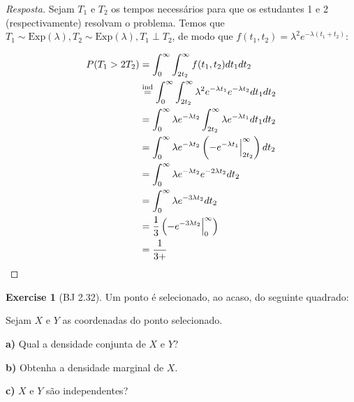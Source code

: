 \documentclass[
]{article}
\theoremstyle{definition}
\theoremstyle{definition}
\theoremstyle{definition}
\newtheorem{exercise}{Exercise}[section]
\theoremstyle{definition}
\theoremstyle{remark}
\begin{document}
\begin{proof}[Resposta]
Sejam \(T_{1}\) e \(T_{2}\) os tempos necessários para que os estudantes 1 e 2 (respectivamente) resolvam o problema. Temos que \(T_{1} \sim \mathrm{Exp}(\lambda),T_{2} \sim \mathrm{Exp}(\lambda), T_{1} \perp T_{2}\), de modo que \(f(t_{1},t_{2}) = \lambda^{2}e^{-\lambda(t_{1} + t_{2})}\):

\begin{align*}
P(T_{1} > 2T_{2}) &= \int_{0}^{\infty}\int_{2t_{2}}^{\infty}f(t_{1},t_{2})dt_{1}dt_{2} \\
&\stackrel{\text{ind}}{=} \int_{0}^{\infty}\int_{2t_{2}}^{\infty}\lambda^{2}e^{-\lambda t_{1}}e^{-\lambda t_{2}}dt_{1}dt_{2} \\
&= \int_{0}^{\infty}\lambda e^{-\lambda t_{2}}\int_{2t_{2}}^{\infty}\lambda e^{-\lambda t_{1}}dt_{1}dt_{2} \\
&= \int_{0}^{\infty}\lambda e^{-\lambda t_{2}}\left(-e^{-\lambda t_{1}}\Big{|}_{2t_{2}}^{\infty}\right)dt_{2} \\
&= \int_{0}^{\infty}\lambda e^{-\lambda t_{2}}e^{-2\lambda t_{2}}dt_{2} \\
&= \int_{0}^{\infty}\lambda e^{-3\lambda t_{2}}dt_{2} \\
&= \frac{1}{3}\left(-e^{-3\lambda t_{2}}\Big{|}_{0}^{\infty}\right) \\
&= \frac{1}{3+}
\end{align*}
\end{proof}

\begin{exercise}[BJ 2.32]
Um ponto é selecionado, ao acaso, do seguinte quadrado:

\begin{center}
\end{center}

Sejam \(X\) e \(Y\) as coordenadas do ponto selecionado.

\textbf{a)} Qual a densidade conjunta de \(X\) e \(Y\)?

\textbf{b)} Obtenha a densidade marginal de \(X\).

\textbf{c)} \(X\) e \(Y\) são independentes?
\end{exercise}
\end{document}
